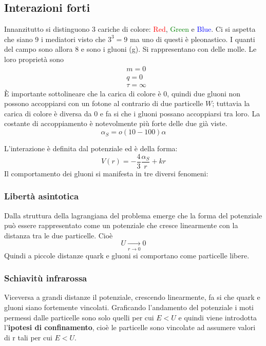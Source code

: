 \documentclass[12pt]{book}
\begin{document}
\subsection{Interazioni forti}
Innanzitutto si distinguono 3 cariche di colore: \textcolor{red}{Red}, \textcolor{green}{Green} e \textcolor{blue}{Blue}. Ci si aspetta che siano 9 i mediatori visto che $3^3=9$ ma uno di questi è pleonastico. I quanti del campo sono allora 8 e sono i gluoni (g). Si rappresentano con delle molle. Le loro proprietà sono
\begin{align}
	&m=0\\
	&q=0\\
	&\tau=\infty
\end{align}
È importante sottolineare che la carica di colore è 0, quindi due gluoni non possono accoppiarsi con un fotone al contrario di due particelle $W$; tuttavia la carica di colore è diversa da 0 e fa si che i gluoni possano accoppiarsi tra loro. La costante di accoppiamento è notevolmente più forte delle due già viste.
\begin{equation}
	\alpha_S = o(10-100)\alpha 
\end{equation}

L'interazione è definita dal potenziale ed è della forma:
\begin{equation}
	V(r)= - \frac{4}{3} \frac{\alpha_S}{r} + kr
\end{equation}
 Il comportamento dei gluoni si manifesta in tre diversi fenomeni:
 
 \subsubsection{Libertà asintotica}
 Dalla struttura della lagrangiana del problema emerge che la forma del potenziale può essere rappresentato come un potenziale che cresce linearmente con la distanza tra le due particelle. Cioè
 \begin{equation}
 	U \underset{r \rightarrow 0}{\longrightarrow} 0
 \end{equation}
 Quindi a piccole distanze quark e gluoni si comportano come particelle libere.
 
\subsubsection{Schiavitù infrarossa}
Viceversa a grandi distanze il potenziale, crescendo linearmente, fa si che quark e gluoni siano fortemente vincolati. Graficando l'andamento del potenziale i moti permessi dalle particelle sono solo quelli per cui $E<U$ e quindi viene introdotta l'\textbf{ipotesi di confinamento}, cioè le particelle sono vincolate ad assumere valori di r tali per cui $E<U$. 
\end{document}

